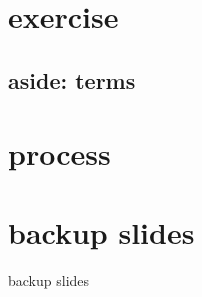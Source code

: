 \section{exercise}


\subsection{aside: terms}


\section{process}




\section{backup slides}
\begin{frame}{backup slides}
\end{frame}




